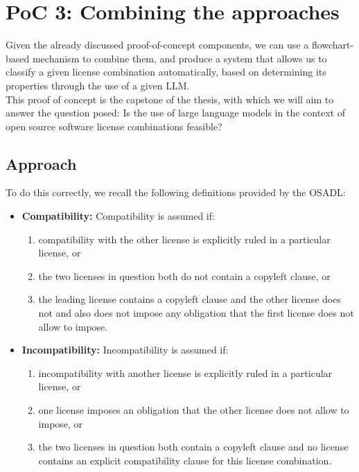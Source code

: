 \section{PoC 3: Combining the approaches}

Given the already discussed proof-of-concept components, we can use a flowchart-based mechanism to combine them, and produce a system that allows us to classify a given license combination automatically, based on determining its properties through the use of a given LLM. \\

This proof of concept is the capstone of the thesis, with which we will aim to answer the question posed: Is the use of large language models in the context of open source software license combinations feasible?

\subsection{Approach}

To do this correctly, we recall the following definitions provided by the OSADL:

\begin{itemize}
	\item \textbf{Compatibility:} Compatibility is assumed if:
	\begin{enumerate}
		\item compatibility with the other license is explicitly ruled in a particular license, or
		\item the two licenses in question both do not contain a copyleft clause, or
		\item the leading license contains a copyleft clause and the other license does not and also does not impose any obligation that the first license does not allow to impose.
	\end{enumerate}
	
	\item \textbf{Incompatibility:} Incompatibility is assumed if:
	\begin{enumerate}
		\item incompatibility with another license is explicitly ruled in a particular license, or
		\item one license imposes an obligation that the other license does not allow to impose, or
		\item the two licenses in question both contain a copyleft clause and no license contains an explicit compatibility clause for this license combination.
	\end{enumerate}
\end{itemize}


